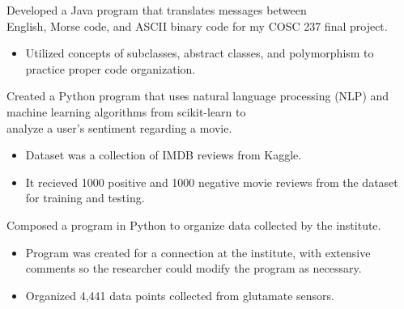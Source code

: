 

Developed a Java program that translates messages between \\ English, Morse code, and ASCII binary code for my COSC 237 final project.
\begin{itemize}
\item Utilized concepts of subclasses, abstract classes, and polymorphism to practice proper code organization.
\end{itemize}

\divider

Created a Python program that uses natural language processing (NLP) and machine learning algorithms from scikit-learn to \\ analyze a user's sentiment regarding a movie.
\begin{itemize}
\item Dataset was a collection of IMDB reviews from Kaggle.
\item It recieved 1000 positive and 1000 negative movie reviews from the dataset for training and testing.
\end{itemize}

\divider

Composed a program in Python to organize data collected by the institute.
\begin{itemize}
\item Program was created for a connection at the institute, with extensive comments so the researcher could modify the program as necessary.
\item Organized 4,441 data points collected from glutamate sensors.
\end{itemize}
